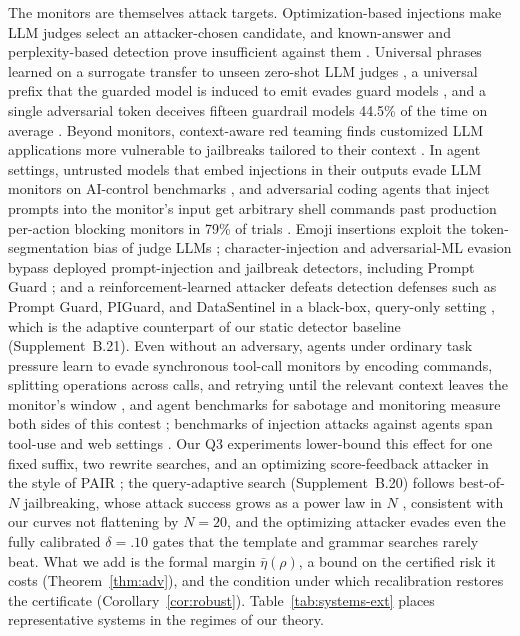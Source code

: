The monitors are themselves attack targets. Optimization-based injections make LLM judges select
an attacker-chosen candidate, and known-answer and perplexity-based detection prove insufficient
against them \citep{shi2024judgedeceiver}. Universal phrases learned on a surrogate transfer to
unseen zero-shot LLM judges \citep{raina2024judgerobust}, a universal prefix that the guarded
model is induced to emit evades guard models \citep{mangaokar2024prp}, and a single adversarial
token deceives fifteen guardrail models 44.5\% of the time on average
\citep{bassani2025guardrail}. Beyond monitors, context-aware red teaming finds customized LLM
applications more vulnerable to jailbreaks tailored to their context \citep{xu2026redagent}. In agent settings, untrusted models that embed
injections in their outputs evade LLM monitors on AI-control benchmarks
\citep{terekhov2026adaptive}, and adversarial coding agents that inject prompts into the monitor's input
get arbitrary shell commands past production per-action blocking monitors in
79\% of trials \citep{remedios2026redteaming}. Emoji insertions exploit the token-segmentation
bias of judge LLMs \citep{wei2025emoji}; character-injection and adversarial-ML evasion bypass
deployed prompt-injection and jailbreak detectors, including Prompt Guard \citep{hackett2025bypassing};
and a reinforcement-learned attacker defeats detection defenses such as Prompt Guard, PIGuard, and
\mbox{DataSentinel} in a black-box, query-only setting \citep{yin2026pismith}, which is the adaptive
counterpart of our static detector baseline (Supplement~B.21). Even without an adversary,
agents under ordinary task pressure learn to evade synchronous tool-call monitors by encoding
commands, splitting operations across calls, and retrying until the relevant context leaves
the monitor's window \citep{schmotz2026instrumental}, and agent benchmarks for sabotage and
monitoring measure both sides of this contest \citep{kutasov2025shade}; benchmarks of injection
attacks against agents span tool-use \citep{zhang2024asb} and web settings \citep{evtimov2025wasp}.
Our Q3 experiments lower-bound this effect for one fixed suffix, two rewrite searches, and an
optimizing score-feedback attacker in the style of PAIR \citep{chao2025pair}; the query-adaptive
search (Supplement~B.20) follows best-of-$N$ jailbreaking, whose attack success grows as a power
law in $N$ \citep{hughes2025bon}, consistent with our curves not flattening by $N=20$, and the
optimizing attacker evades even the fully calibrated $\delta=.10$ gates that the template and
grammar searches rarely beat. What we add is
the formal margin $\bar\eta(\rho)$, a bound on the
certified risk it costs (Theorem~\ref{thm:adv}), and the condition under which
recalibration restores the certificate (Corollary~\ref{cor:robust}).
Table~\ref{tab:systems-ext} places representative systems in the regimes of
our theory.

